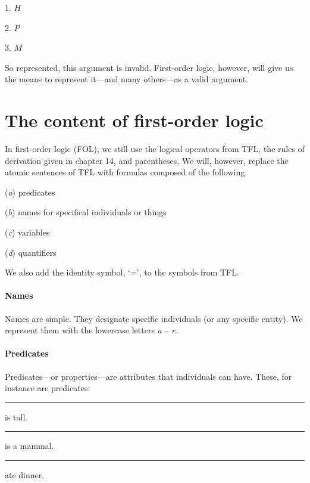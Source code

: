 \begin{minipage}{10cm}
\bigskip
\begin{earg}
\item[1.] $H$
\item[2.] $P$
\item[3.] $M$
\end{earg}
\smallskip
\end{minipage}

\noindent So represented, this argument is invalid. First-order logic, however, will give us the means to represent it---and many others---as a valid argument.


\section{The content of first-order logic}

In first-order logic (FOL), we still use the logical operators from TFL, the rules of derivation given in chapter 14, and parentheses. We will, however, replace the atomic sentences of TFL with formulas composed of the following.

\begin{ebullet}
	\item[(\textit{a})] predicates
	\item[(\textit{b})] names for specifical individuals or things 
	\item[(\textit{c})] variables 
	\item[(\textit{d})] quantifiers
\end{ebullet}
We also add the identity symbol, ‘=’, to the symbols from TFL.  


\paragraph{Names}

Names are simple. They designate specific individuals (or any specific entity). We represent them with the lowercase letters \textit{a} -- \textit{r}.

\paragraph{Predicates}

Predicates---or properties---are attributes that individuals can have. These, for instance are predicates:

\begin{ebullet}
	\item[] \rule{1cm}{0.15mm} is tall.
	\item[] \rule{1cm}{0.15mm} is a mammal.
	\item[] \rule{1cm}{0.15mm} ate dinner.
\end{ebullet}

